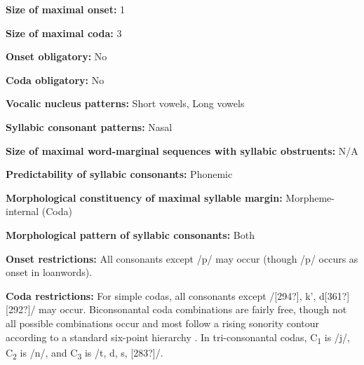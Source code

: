 \begin{styleBody}
\textbf{Size of maximal onset:} 1
\end{styleBody}

\begin{styleBody}
\textbf{Size of maximal coda:} 3
\end{styleBody}

\begin{styleBody}
\textbf{Onset obligatory:} No
\end{styleBody}

\begin{styleBody}
\textbf{Coda obligatory:} No
\end{styleBody}

\begin{styleBody}
\textbf{Vocalic nucleus patterns:} Short vowels, Long vowels
\end{styleBody}

\begin{styleBody}
\textbf{Syllabic consonant patterns:} Nasal
\end{styleBody}

\begin{styleBody}
\textbf{Size of maximal word{}-marginal sequences with syllabic obstruents:} N/A
\end{styleBody}

\begin{styleBody}
\textbf{Predictability of syllabic consonants:} Phonemic
\end{styleBody}

\begin{styleBody}
\textbf{Morphological constituency of maximal syllable margin:} Morpheme-internal (Coda)
\end{styleBody}

\begin{styleBody}
\textbf{Morphological pattern of syllabic consonants:} Both
\end{styleBody}

\begin{styleBody}
\textbf{Onset restrictions: }All consonants except /p/ may occur (though /p/ occurs as onset in loanwords).
\end{styleBody}

\begin{styleBody}
\textbf{Coda restrictions: }For simple codas, all consonants except /[294?], k’, d[361?][292?]/ may occur. Biconsonantal coda combinations are fairly free, though not all possible combinations occur and most follow a rising sonority contour according to a standard six-point hierarchy . In tri-consonantal codas, C\textsubscript{1} is /j/, C\textsubscript{2} is /n/, and C\textsubscript{3} is /t, d, s, [283?]/.
\end{styleBody}

